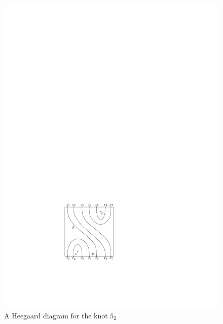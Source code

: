 \begin{example}

\begin{figure}[tb]
\centering
\includegraphics[scale=1]{graphics/5-2-heegaard-diagram}
\caption{A Heegaard diagram for the knot $5_2$}
\label{5-2-heegaard-diagram}
\end{figure}


\end{example}
